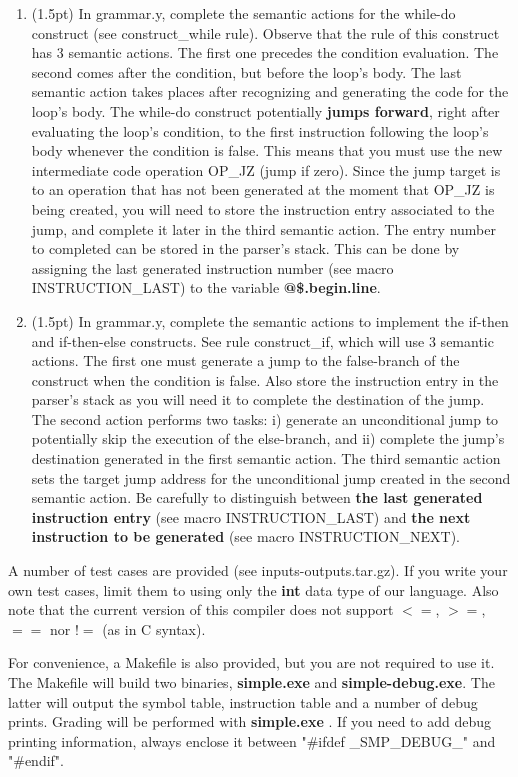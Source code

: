 \documentclass[letter,10pt]{article}
\begin{document}
\begin{enumerate}
\item (1.5pt)
In grammar.y, complete the semantic actions  for the while-do construct (see construct\_while rule).
Observe that the rule of this construct has 3 semantic actions. The first one precedes the condition
evaluation. The second comes after the condition, but before the loop's body. The last semantic action
takes places after recognizing and generating the code for the loop's body.
The while-do construct potentially {\bf jumps forward}, right after evaluating the loop's condition, 
to the first instruction following the loop's body whenever the condition is false.
This means that you must use the new intermediate code operation OP\_JZ (jump if zero).
Since the jump target is to an operation that has not been generated at the moment that OP\_JZ is being created, 
you will need to store the instruction entry associated to the jump, and complete it later in the third 
semantic action. The entry number to completed can be stored in the 
parser's stack. This can be done by assigning the last generated instruction number
(see macro INSTRUCTION\_LAST) to the variable {\bf @\$.begin.line}.

\item (1.5pt)
In grammar.y, complete the semantic actions to implement the if-then and if-then-else constructs.
See rule construct\_if, which will use 3 semantic actions. The first one must generate
a jump to the false-branch of the construct when the condition is false. Also store
the instruction entry in the parser's stack as you will need it to complete the destination of the
jump. The second action performs two tasks: i) generate an unconditional jump to potentially
skip the execution of the else-branch, and ii) complete the jump's destination generated
in the first semantic action. The third semantic action sets the target jump address for the
unconditional jump created in the second semantic action. Be carefully to distinguish
between {\bf the last generated instruction entry} (see macro INSTRUCTION\_LAST) and
{\bf the next instruction to be generated} (see macro INSTRUCTION\_NEXT).


\end{enumerate}

A number of test cases are provided (see inputs-outputs.tar.gz). 
If you write your own test cases, limit them to using only the {\bf int}
data type of our language. Also note that the current version of this compiler does not support $<=$, $>=$, $==$ nor $!=$ (as in C syntax).

For convenience, a Makefile is also provided, but you are not required to use it.
The Makefile will build two binaries, {\bf simple.exe} and {\bf simple-debug.exe}. The latter will output
the symbol table, instruction table and a number of debug prints. Grading will be performed with
{\bf simple.exe} . If you need to add debug printing information, always enclose it between "\#ifdef \_SMP\_DEBUG\_" and "\#endif".
\end{document}
